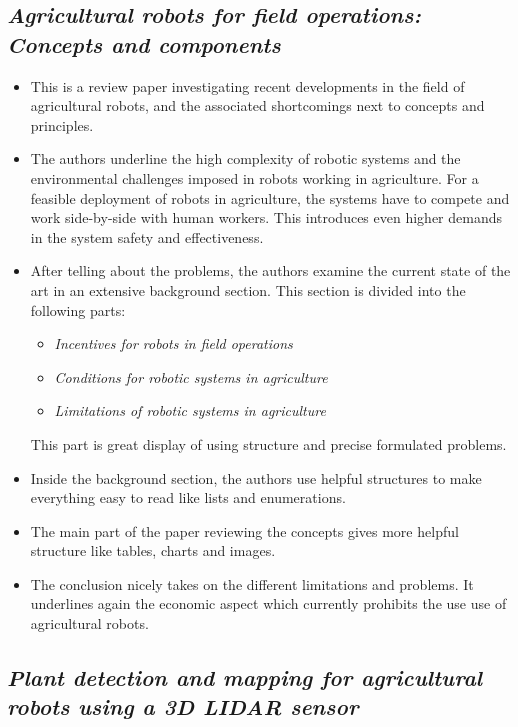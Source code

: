 \documentclass{article}
\begin{document}
\subsection*{\emph{Agricultural robots for field operations: Concepts and components}}
\cite{Bechar2016}

\begin{itemize}
  \item This is a review paper investigating recent developments in the field of agricultural robots, and the associated shortcomings next to concepts and principles.
  \item The authors underline the high complexity of robotic systems and the environmental challenges imposed in robots working in agriculture. For a feasible deployment of robots in agriculture, the systems have to compete and work side-by-side with human workers. This introduces even higher demands in the system safety and effectiveness.
  \item After telling about the problems, the authors examine the current state of the art in an extensive background section. This section is divided into the following parts:\\ \begin{itemize}
    \item \emph{Incentives for robots in field operations}
    \item \emph{Conditions for robotic systems in agriculture}
    \item \emph{Limitations of robotic systems in agriculture}
  \end{itemize}
  This part is great display of using structure and precise formulated problems. 
  \item Inside the background section, the authors use helpful structures to make everything easy to read like lists and enumerations.
  \item The main part of the paper reviewing the concepts gives more helpful structure like tables, charts and images.
  \item The conclusion nicely takes on the different limitations and problems. It underlines again the economic aspect which currently prohibits the use use of agricultural robots.
\end{itemize}

\subsection*{\emph{Plant detection and mapping for agricultural robots using a 3D LIDAR sensor}}
\cite{Weiss2011}
\end{document}
